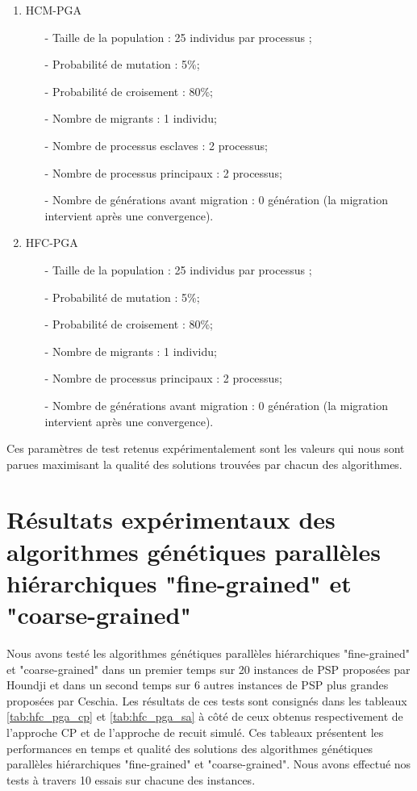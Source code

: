 		\begin{enumerate}
			\item HCM-PGA \\
				\begin{itemize}
					\item[-] Taille de la population : 25 individus par processus ;
			        \item[-] Probabilité de mutation : 5\%;
			        \item[-] Probabilité de croisement : 80\%;
			        \item[-] Nombre de migrants : 1 individu;
		 	        \item[-] Nombre de processus esclaves : 2 processus;
			        \item[-] Nombre de processus principaux : 2 processus;
			        \item[-] Nombre de générations avant migration : 0 génération (la migration intervient après une convergence).
				\end{itemize}
				\vspace*{.5cm}
			\item HFC-PGA \\
				\begin{itemize}
					\item[-] Taille de la population : 25 individus par processus ;
			        \item[-] Probabilité de mutation : 5\%;
			        \item[-] Probabilité de croisement : 80\%;
			        \item[-] Nombre de migrants : 1 individu;
			        \item[-] Nombre de processus principaux : 2 processus;
			        \item[-] Nombre de générations avant migration : 0 génération (la migration intervient après une convergence).
				\end{itemize}
		\end{enumerate}
		Ces paramètres de test retenus expérimentalement sont les valeurs qui nous sont parues maximisant la qualité des solutions trouvées par chacun des algorithmes.		
		
		\section{Résultats expérimentaux des algorithmes génétiques parallèles hiérarchiques "fine-grained" et "coarse-grained"}
		Nous avons testé les algorithmes génétiques parallèles hiérarchiques "fine-grained" et "coarse-grained" dans un premier temps sur 20 instances de PSP proposées par Houndji et dans un second temps sur 6 autres instances de PSP plus grandes proposées par Ceschia. Les résultats de ces tests sont consignés dans les tableaux \ref{tab:hfc_pga_cp} et \ref{tab:hfc_pga_sa} à côté de ceux obtenus respectivement de l'approche CP et de l'approche de recuit simulé. Ces tableaux présentent les performances en temps et qualité des solutions des algorithmes génétiques parallèles hiérarchiques "fine-grained" et "coarse-grained". Nous avons effectué nos tests à travers 10 essais sur chacune des instances.
		

